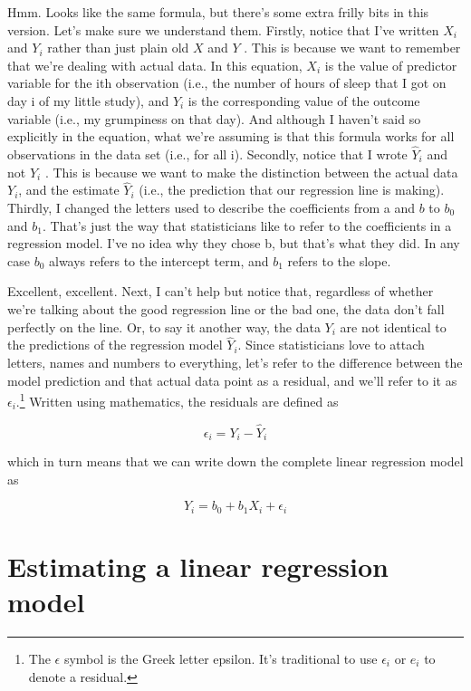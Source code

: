 \documentclass[
  a4paper,
]{book}
\begin{document}
Hmm. Looks like the same formula, but there's some extra frilly bits in
this version. Let's make sure we understand them. Firstly, notice that
I've written \(X_i\) and \(Y_i\) rather than just plain old \(X\) and
\(Y\) . This is because we want to remember that we're dealing with
actual data. In this equation, \(X_i\) is the value of predictor
variable for the ith observation (i.e., the number of hours of sleep
that I got on day i of my little study), and \(Y_i\) is the
corresponding value of the outcome variable (i.e., my grumpiness on that
day). And although I haven't said so explicitly in the equation, what
we're assuming is that this formula works for all observations in the
data set (i.e., for all i). Secondly, notice that I wrote \(\hat{Y}_i\)
and not \(Y_i\) . This is because we want to make the distinction
between the actual data \(Y_i\), and the estimate \(\hat{Y}_i\) (i.e.,
the prediction that our regression line is making). Thirdly, I changed
the letters used to describe the coefficients from a and \(b\) to
\(b_0\) and \(b_1\). That's just the way that statisticians like to
refer to the coefficients in a regression model. I've no idea why they
chose b, but that's what they did. In any case \(b_0\) always refers to
the intercept term, and \(b_1\) refers to the slope.

Excellent, excellent. Next, I can't help but notice that, regardless of
whether we're talking about the good regression line or the bad one, the
data don't fall perfectly on the line. Or, to say it another way, the
data \(Y_i\) are not identical to the predictions of the regression
model \(\hat{Y}_i\). Since statisticians love to attach letters, names
and numbers to everything, let's refer to the difference between the
model prediction and that actual data point as a residual, and we'll
refer to it as \(\epsilon_i\).\footnote{The \(\epsilon\) symbol is the
  Greek letter epsilon. It's traditional to use \(\epsilon_i\) or
  \(e_i\) to denote a residual.} Written using mathematics, the
residuals are defined as

\[\epsilon_i=Y_i-\hat{Y}_i\]

which in turn means that we can write down the complete linear
regression model as

\[Y_i=b_0+b_1X_i+\epsilon_i\]

\hypertarget{estimating-a-linear-regression-model}{%
\section{Estimating a linear regression
model}\label{estimating-a-linear-regression-model}}
\end{document}
